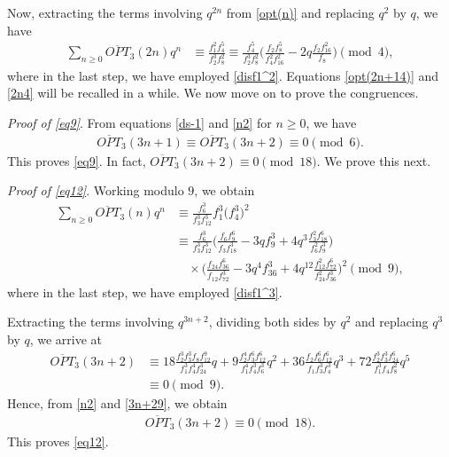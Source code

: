 \documentclass[12pt,reqno]{amsart}
\numberwithin{equation}{section}
\newcommand{\opt}{\overline{OPT}}
\begin{document}
Now, extracting the terms involving $q^{2n}$ from \eqref{opt(n)} and replacing $q^2$ by $q$, we have 
\begin{align}\label{2n4}
     \sum_{n\geq 0}\opt_3(2n)q^n &\equiv \frac{f_{1}^2f_{4}^5}{f_{2}^3f_{8}^2}\equiv \frac{f_{4}^5}{f_{2}^3f_{8}^2}\Bigg(\frac{f_{2}f_{8}^5}{f_{4}^2f_{16}^2} - 2 q \frac{f_{2} f_{16}^2 }{f_{8}}\Bigg) \pmod{4},
\end{align}
where in the last step, we have employed \eqref{disf1^2}. Equations \eqref{opt(2n+14)} and \eqref{2n4} will be recalled in a while. We now move on to prove the congruences.

\emph{Proof of \eqref{eq9}}. From equations \eqref{ds-1} and \eqref{n2} for $n\geq0$, we have
\begin{align}
    \opt_3(3n+1) \equiv \opt_3(3n+2) \equiv 0 \pmod{6}.
\end{align}
This proves \eqref{eq9}. In fact, $\opt_3(3n+2) \equiv 0 \pmod{18}$. We prove this next. 

\emph{Proof of \eqref{eq12}}. Working modulo $9$, we obtain
\begin{align}
     \sum_{n\geq 0}\opt_3(n)q^n &\equiv \frac{f_{6}^3 }{f_{3}^3 f_{12}^3} f_{1}^3 \Bigg(f_{4}^3\Bigg)^2 \nonumber\\
     &\equiv \frac{f_{6}^3 }{f_{3}^3 f_{12}^3} \Bigg(\frac{f_{6}f_{9}^6}{f_{3}f_{18}^3}-3qf_{9}^3+4q^3 \frac{f_{3}^2f_{18}^6}{f_{6}^2f_{9}^3}\Bigg)\nonumber \\ &\quad \times \Bigg(\frac{f_{24}f_{36}^6}{f_{12}f_{72}^3}-3q^4f_{36}^3+4q^{12} \frac{f_{12}^2f_{72}^6}{f_{24}^2f_{36}^3}\Bigg)^2 \pmod{9},
\end{align}
where in the last step, we have employed \eqref{disf1^3}.

Extracting the terms involving $q^{3n+2}$, dividing both sides by $q^2$ and replacing $q^3$ by $q$, we arrive at
\begin{align}
    \opt_3(3n+2) &\equiv 18\frac{ f_2^3 f_3^3 f_{8} f_{12}^9 }{f_1^3 f_{4}^4 f_{24}^3} q+ 9\frac{ f_2^4 f_3^6 f_{12}^6 }{f_1^4 f_{4}^3 f_{6}^3} q^2+36\frac{ f_2 f_{6}^6 f_{12}^6 }{f_1 f_3^3 f_{4}^3} q^3+ 72\frac{ f_2^3 f_3^3 f_{24}^6 }{f_1^3 f_{4} f_{8}^2}q^{5} \nonumber\\
    &\equiv 0 \pmod{9}.\label{3n+29}
\end{align}
Hence, from \eqref{n2} and \eqref{3n+29}, we obtain 
\begin{align*}
     \opt_3(3n+2) \equiv 0 \pmod{18}.
\end{align*}
This proves \eqref{eq12}.
\end{document}
